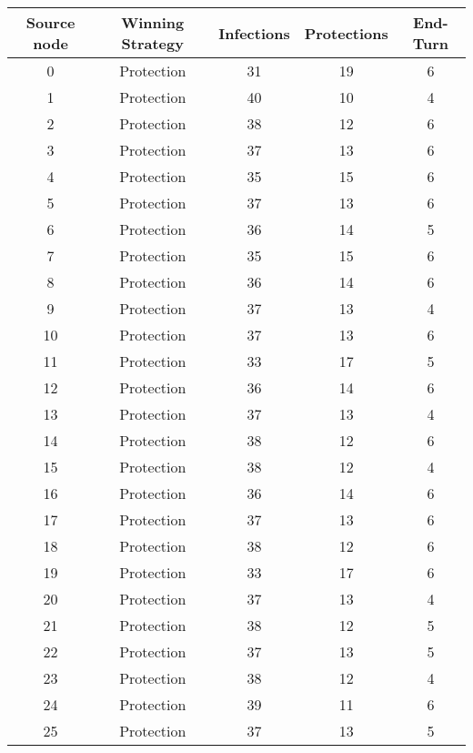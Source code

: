 \documentclass[results.tex]{subfiles}
\begin{document}
\begin{center}
  \begin{tabular}{| c || c | c | c | c |}
    \hline
    {\bfseries Source node} & {\bfseries Winning Strategy} & {\bfseries Infections} & {\bfseries Protections} & {\bfseries End-Turn} \\  %
    \hline\hline
    0 & Protection & 31 & 19 & 6 \\ 
    \hline
    1 & Protection & 40 & 10 & 4 \\ 
    \hline
    2 & Protection & 38 & 12 & 6 \\ 
    \hline
    3 & Protection & 37 & 13 & 6 \\ 
    \hline
    4 & Protection & 35 & 15 & 6 \\ 
    \hline
    5 & Protection & 37 & 13 & 6 \\ 
    \hline
    6 & Protection & 36 & 14 & 5 \\ 
    \hline
    7 & Protection & 35 & 15 & 6 \\ 
    \hline
    8 & Protection & 36 & 14 & 6 \\ 
    \hline
    9 & Protection & 37 & 13 & 4 \\ 
    \hline
    10 & Protection & 37 & 13 & 6 \\ 
    \hline
    11 & Protection & 33 & 17 & 5 \\ 
    \hline
    12 & Protection & 36 & 14 & 6 \\ 
    \hline
    13 & Protection & 37 & 13 & 4 \\ 
    \hline
    14 & Protection & 38 & 12 & 6 \\ 
    \hline
    15 & Protection & 38 & 12 & 4 \\ 
    \hline
    16 & Protection & 36 & 14 & 6 \\ 
    \hline
    17 & Protection & 37 & 13 & 6 \\ 
    \hline
    18 & Protection & 38 & 12 & 6 \\ 
    \hline
    19 & Protection & 33 & 17 & 6 \\ 
    \hline
    20 & Protection & 37 & 13 & 4 \\ 
    \hline
    21 & Protection & 38 & 12 & 5 \\ 
    \hline
    22 & Protection & 37 & 13 & 5 \\ 
    \hline
    23 & Protection & 38 & 12 & 4 \\ 
    \hline
    24 & Protection & 39 & 11 & 6 \\ 
    \hline
    25 & Protection & 37 & 13 & 5 \\ 

\end{tabular}
\end{center}
\end{document}
